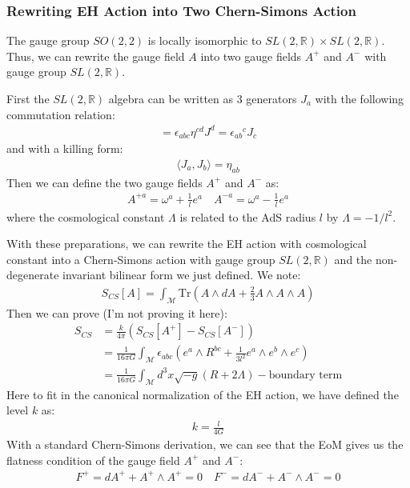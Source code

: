 \subsubsection{Rewriting EH Action into Two Chern-Simons Action}

The gauge group $ SO(2,2) $ is locally isomorphic to $ SL(2,\mathbb{R})
\times SL(2,\mathbb{R}) $. Thus, we can rewrite the gauge field $ A $
into two gauge fields $ A^+ $ and $ A^- $ with gauge group $ SL(2,\mathbb{R}) $.

First the $ SL(2,\mathbb{R}) $ algebra can be written as 3 generators
$ J_a $ with the following commutation relation:
\begin{align}
  [J_a, J_b] = \epsilon_{abc} \eta^{cd} J^d = \epsilon_{ab}{}^c J_c
\end{align}
and with a killing form:
\begin{align}
  \langle J_a, J_b \rangle =  \eta_{ab}
\end{align}
Then we can define the two gauge fields $ A^+ $ and $ A^- $ as:
\begin{align}
  A^{+a} = \omega^a + \frac{1}{l} e^a \quad A^{-a}  = \omega^a -
  \frac{1}{l} e^a
\end{align}
where the cosmological constant $ \Lambda $ is related to the AdS
radius $ l $ by $\Lambda = -{1}/{l^2}$.

With these preparations, we can rewrite the EH action with
cosmological constant into a
Chern-Simons action with gauge group $ SL(2,\mathbb{R}) $ and the
non-degenerate invariant bilinear form we just defined. We note:
\begin{align}
  S_{CS}[A] = \int_{\mathcal{M}} \mathrm{Tr}\left( A \wedge dA + \frac{2}{3} A
  \wedge A \wedge A \right)
\end{align}
Then we can prove (I'm not proving it here):
\begin{align}
  S_{CS} & = \displaystyle\frac{k}{4 \pi} (S_{CS}[A^+] - S_{CS}[A^-] )\\
  & = \displaystyle\frac{1}{16 \pi G} \int_{\mathcal{M}}
  \epsilon_{abc} \left( e^a \wedge R^{bc} + \frac{1}{3 l^2} e^a
  \wedge e^b \wedge e^c \right) \\
  & = \displaystyle\frac{1}{16 \pi G} \int_{\mathcal{M}} d^3 x
  \sqrt{-g} (R + 2 \Lambda) - \text{boundary term}
\end{align}
Here to fit in the canonical normalization of the EH action, we have
defined the level $ k $ as:
\begin{align}
  k = \displaystyle\frac{l}{4 G}
\end{align}
With a standard Chern-Simons derivation, we can see that the EoM
gives us the flatness condition of the gauge field $ A^+ $ and $ A^-
$:
\begin{align}
  F^+ = dA^+ + A^+ \wedge A^+ = 0 \quad F^- = dA^- + A^- \wedge A^- = 0
\end{align}

